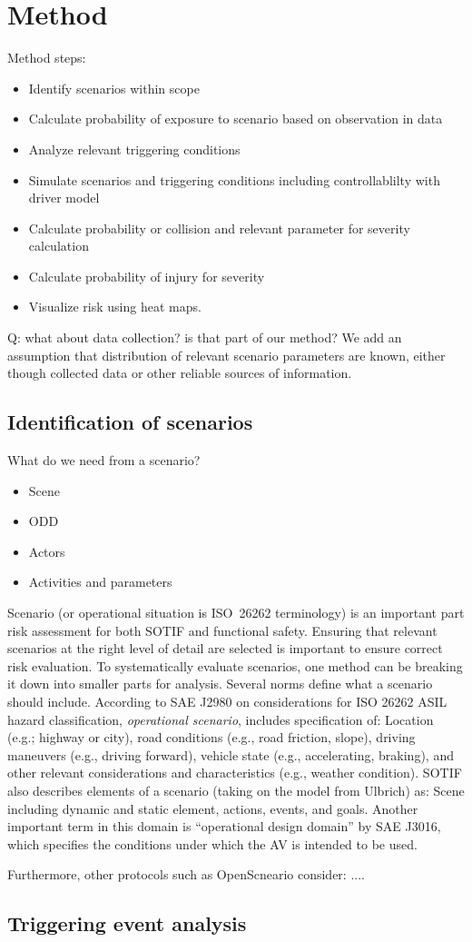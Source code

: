 \section{Method}
\label{sec:method}

Method steps:
\begin{itemize}
    \item Identify scenarios within scope 
    \item Calculate probability of exposure to scenario based on observation in data
    \item Analyze relevant triggering conditions 
    \item Simulate scenarios and triggering conditions including controllablilty with driver model 
    \item Calculate probability or collision and relevant parameter for severity calculation 
    \item Calculate probability of injury for severity  
    \item Visualize risk using heat maps. 
\end{itemize}
Q: what about data collection? is that part of our method? 
We add an assumption that distribution of relevant scenario parameters are known, either though collected data or other reliable sources of information. 

\subsection{Identification of scenarios}

What do we need from a scenario?
\begin{itemize}
    \item Scene 
    \item ODD
    \item Actors 
    \item Activities and parameters 
\end{itemize}

Scenario (or operational situation is ISO~26262 terminology) is an important part risk assessment for both SOTIF and functional safety. 
Ensuring that relevant scenarios at the right level of detail are selected is important to ensure correct risk evaluation. 
To systematically evaluate scenarios, one method can be breaking it down into smaller parts for analysis.  
Several norms define what a scenario should include. 
According to SAE J2980 on considerations for ISO 26262 ASIL hazard classification, \textit{operational scenario}, includes specification of: Location (e.g.; highway or city), road conditions (e.g., road friction, slope), driving maneuvers (e.g., driving forward), vehicle state (e.g., accelerating, braking), and other relevant considerations and characteristics (e.g., weather condition). 
SOTIF also describes elements of a scenario (taking on the model from Ulbrich) as: Scene including dynamic and static element, actions, events, and goals. 
Another important term in this domain is ``operational design domain'' by SAE J3016, which specifies the conditions under which the AV is intended to be used.

Furthermore, other protocols such as OpenScneario consider: ....


\subsection{Triggering event analysis}

